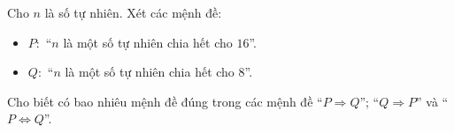 \begin{ex}
Cho $n$ là số tự nhiên. Xét các mệnh đề:
\begin{itemize}
\item $P\colon$ ``$n$ là một số tự nhiên chia hết cho $16$''.
\item $Q\colon$ ``$n$ là một số tự nhiên chia hết cho $8$''.
\end{itemize}
Cho biết có bao nhiêu mệnh đề đúng trong các mệnh đề ``$P\Rightarrow Q$''; ``$Q\Rightarrow P$'' và ``$P\Leftrightarrow Q$''.
\end{ex}
